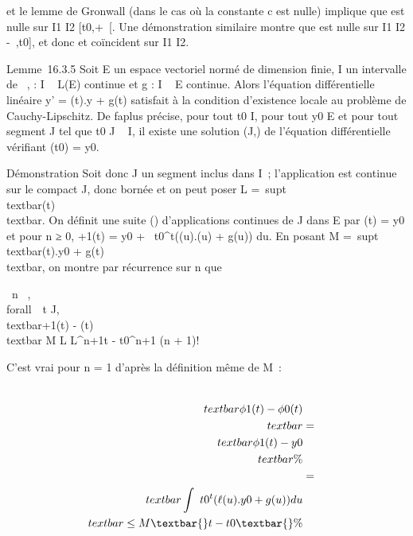 et le lemme de Gronwall (dans le cas où la constante c est nulle)
implique que \phi est nulle sur I1 \bigcap I2 \bigcap
{[}t0,+\infty~{[}. Une démonstration similaire montre que \phi est
nulle sur I1 \bigcap I2\bigcap{]} -\infty~,t0{]}, et donc
 et  coïncident sur I1 \bigcap I2.

Lemme~16.3.5 Soit E un espace vectoriel normé de dimension finie, I un
intervalle de ~, \ell : I \rightarrow~ L(E) continue et g : I \rightarrow~ E continue. Alors
l'équation différentielle linéaire y' = \ell(t).y + g(t) satisfait à la
condition d'existence locale au problème de Cauchy-Lipschitz. De
fa\ccon plus précise, pour tout t0 \in I,
pour tout y0 \in E et pour tout segment J tel que t0 \in
J \subset~ I, il existe une solution (J,\phi) de l'équation différentielle
vérifiant \phi(t0) = y0.

Démonstration Soit donc J un segment inclus dans I~; l'application \ell est
continue sur le compact J, donc bornée et on peut poser L
=\
supt\inJ\\textbar{}\ell(t)\\textbar{}.
On définit une suite (\phin) d'applications continues de J dans E
par \phi0(t) = y0 et pour n ≥ 0, \phin+1(t) =
y0 +\int ~
t0^t\left (\ell(u).\phin(u)
+ g(u)\right ) du. En posant M
=\
supt\inJ\\textbar{}\ell(t).y0 +
g(t)\\textbar{}, on montre par récurrence sur n que

\forall~n \in {}~, \\forall~~t \in J,
\\textbar{}\phin+1(t) -
\phin(t)\\textbar{} \leq M \over L
 L^n+1\textbar{}t - t0\textbar{}^n+1
\over (n + 1)!

C'est vrai pour n = 1 d'après la définition même de M~:

\begin{align*}
\\textbar{}\phi1(t) -
\phi0(t)\\textbar{}& =&
\\textbar{}\phi1(t) -
y0\\textbar{} \%&
\\ & =&
\\textbar{}\int ~
t0^t(\ell(u).y 0 + g(u))
du\\textbar{} \leq M\textbar{}t - t0\textbar{}\%&
\\ \end{align*}

